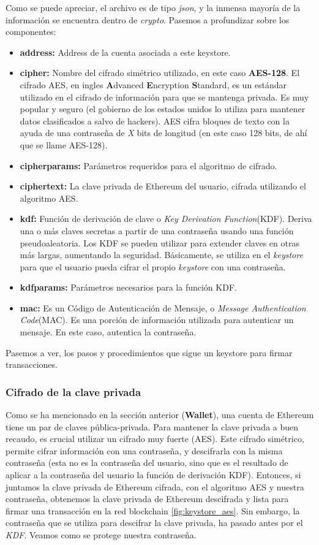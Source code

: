 Como se puede apreciar, el archivo es de tipo \emph{json}, y la inmensa mayoría de la información se encuentra dentro de \emph{crypto}. Pasemos a profundizar sobre los componentes:
\begin{itemize}
\item \textbf{address:} Address de la cuenta asociada a este keystore.
\item \textbf{cipher:} Nombre del cifrado simétrico utilizado, en este caso \textbf{AES-128}. El cifrado AES, en ingles \textbf{A}dvanced \textbf{E}ncryption \textbf{S}tandard, es un estándar utilizado en el cifrado de información para que se mantenga privada. Es muy popular y seguro (el gobierno de los estados unidos lo utiliza para mantener datos clasificados a salvo de hackers). AES cifra bloques de texto con la ayuda de una contraseña de \emph{X} bits de longitud (en este caso 128 bits, de ahí que se llame AES-128). 
\item \textbf{cipherparams:} Parámetros requeridos para el algoritmo de cifrado.
\item \textbf{ciphertext:} La clave privada de Ethereum del usuario, cifrada utilizando el algoritmo AES.
\item \textbf{kdf:} Función de derivación de clave o \emph{Key Derivation Function}(KDF). Deriva una o más claves secretas a partir de una contraseña usando una función pseudoaleatoria. Los KDF se pueden utilizar para extender claves en otras más largas, aumentando la seguridad. Básicamente, se utiliza en el \emph{keystore} para que el usuario pueda cifrar el propio \emph{keystore} con una contraseña.
\item \textbf{kdfparams:} Parámetros necesarios para la función KDF.
\item \textbf{mac:} Es un Código de Autenticación de Mensaje, o \emph{Message Authentication Code}(MAC). Es una porción de información utilizada para autenticar un mensaje. En este caso, autentica la contraseña.
\end{itemize}

Pasemos a ver, los pasos y procedimientos que sigue un keystore para firmar transacciones.

\subsubsection{Cifrado de la clave privada}

Como se ha mencionado en la sección anterior (\textbf{Wallet}), una cuenta de Ethereum tiene un par de claves pública-privada. Para mantener la clave privada a buen recaudo, es crucial utilizar un cifrado muy fuerte (AES). Este cifrado simétrico, permite cifrar información con una contraseña, y descifrarla con la misma contraseña (esta no es la contraseña del usuario, sino que es el resultado de aplicar a la contraseña del usuario la función de derivación KDF). Entonces, si juntamos la clave privada de Ethereum cifrada, con el algoritmo AES y nuestra contraseña, obtenemos la clave privada de Ethereum descifrada y lista para firmar una transacción en la red blockchain \ref{fig:keystore_aes}. Sin embargo, la contraseña que se utiliza para descifrar la clave privada, ha pasado antes por el \emph{KDF}. Veamos como se protege nuestra contraseña.

